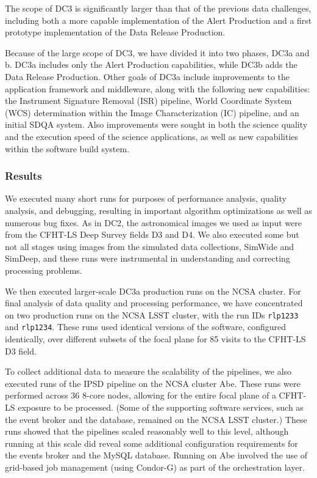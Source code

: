 The scope of DC3 is significantly larger than that of the previous
data challenges, including both a more capable implementation of the 
Alert Production and a first prototype implementation of the Data Release 
Production.

Because of the large scope of DC3, we have divided it into two phases,
DC3a and b.  DC3a includes only the Alert Production capabilities,
while DC3b adds the Data Release Production.  Other goals of DC3a 
include improvements to the application framework
and middleware, along with the following new capabilities:
the Instrument Signature
Removal (ISR) pipeline, World Coordinate System (WCS)
determination within the Image Characterization (IC) pipeline,
and an initial SDQA system. Also improvements were sought
in both the science quality and the execution speed of the
science applications, as well as new capabilities
within the software build system.

\subsubsection*{Results}


We executed many short runs for purposes of performance analysis,
quality analysis, and debugging, resulting in important algorithm
optimizations as well as numerous bug fixes. As in DC2, the astronomical 
images we used as input were from the CFHT-LS Deep Survey fields D3 and D4.
We also executed some but not all stages using 
images from the simulated data collections, SimWide and SimDeep,
and these runs were instrumental in understanding and correcting
processing problems.

We then executed larger-scale DC3a production runs on the NCSA cluster.
For final analysis of data quality and processing performance, we have 
concentrated on two production runs on the NCSA LSST cluster, with the 
run IDs \texttt{rlp1233} and \texttt{rlp1234}. These runs used 
identical versions of the software, configured identically, over 
different subsets of the focal plane for 85 visits to the CFHT-LS
D3 field.

To collect additional data to measure the scalability of the pipelines,
we also executed runs of the IPSD pipeline on the NCSA cluster Abe. 
These runs were performed across 36 8-core nodes, allowing for the
entire focal plane
of a CFHT-LS exposure to be processed. (Some of the supporting
software services, such as the event broker and the database, 
remained on the NCSA LSST cluster.) These runs showed that the
pipelines scaled reasonably well to this level, although running at
this scale did reveal some additional configuration requirements
for the events broker and the MySQL database. Running on Abe
involved the use of grid-based job management (using Condor-G)
as part of the orchestration layer.

